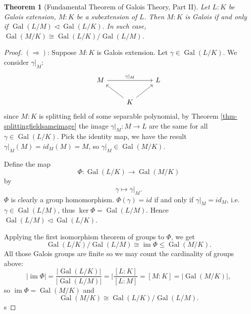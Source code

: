 \documentclass[11pt]{book}
\newtheorem{theorem}{Theorem}[section]
\newcommand{\im}{\mathop{\mathrm{im}}}
\begin{document}
\begin{theorem}[Fundamental Theorem of Galois Theory, Part II]\label{thm-FTGT-2}
    Let $L:K$ be Galois extension, $M:K$ be a subextension of $L$. Then $M:K$ is Galois if and only if $\operatorname{Gal}(L /M)\lhd \operatorname{Gal}(L /K)$. In such case, $\operatorname{Gal}(M /K)\cong \operatorname{Gal}(L /K) /\operatorname{Gal}(L /M)$. 
\end{theorem}

\begin{proof}
    $(\Rightarrow)$: Suppose $M :K$ is Galois extension. Let $\gamma\in \operatorname{Gal}(L /K)$. We consider $\gamma|_{M}$: 
    \[
        \begin{tikzcd}
            M && L \\
            & K
            \arrow["{\gamma|_{M}}", from=1-1, to=1-3]
            \arrow[from=2-2, to=1-1]
            \arrow[from=2-2, to=1-3]
        \end{tikzcd}
    \]
    since $M :K$ is splitting field of some separable polynomial, by Theorem \ref{thm-splittingfieldsameimage} the image $\gamma|_{M}:M\to L$ are the same for all $\gamma\in \operatorname{Gal}(L /K)$. Pick the identity map, we have the result $\gamma|_{M}(M)=id_{M}(M)=M$, so $\gamma|_{M}\in \operatorname{Gal}(M/K)$. 

    Define the map
    \[
    \Phi: \operatorname{Gal}(L /K)\to \operatorname{Gal}(M /K)
    \]
    by \[ 
    \gamma\mapsto \gamma|_{M}.
    \] 
    $\Phi$ is clearly a group homomorphism. $\Phi(\gamma)=id$ if and only if $\gamma|_{M}=id_{M}$, i.e. $\gamma\in \operatorname{Gal}(L /M)$, thus $\ker \Phi=\operatorname{Gal}(L /M)$. Hence $\operatorname{Gal}(L /M)\lhd \operatorname{Gal}(L/K)$. 

    Applying the first isomorphism theorem of groups to $\Phi$, we get 
    \[
    \operatorname{Gal}(L /K)/\operatorname{Gal}(L /M) \cong \im \Phi \leq \operatorname{Gal}(M/K). 
    \]
    All those Galois groups are finite so we may count the cardinality of groups above: 
    \[
    \left| \im \Phi \right| =\frac{\left| \operatorname{Gal}(L /K) \right| }{\left|\operatorname{Gal}(L /M)\right|}=|\frac{[L:K]}{[L:M]}=[M:K]=\left| \operatorname{Gal}(M /K) \right|,
    \]
    so $\im \Phi=\operatorname{Gal}(M /K)$ and 
    \[
    \operatorname{Gal}(M /K)\cong \operatorname{Gal}(L /K)/\operatorname{Gal}(L /M). 
    \]s


\end{proof}
\end{document}
